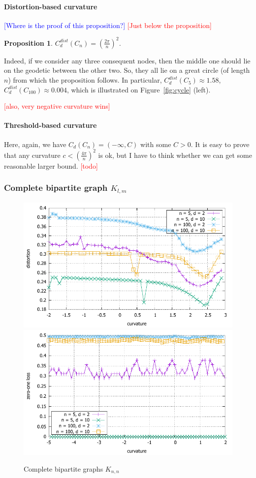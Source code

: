 \documentclass{article} %
\newtheorem{proposition}[theorem]{Proposition}
\newcommand{\ph}[1]{\textcolor{blue}{#1}}
\newcommand{\lt}[1]{\textcolor{red}{#1}}
\begin{document}
\paragraph{Distortion-based curvature} 

\ph{[Where is the proof of this proposition?]} \lt{[Just below the proposition]}

\begin{proposition}\label{prop:cycle_distortion}
$C_d^{dist}(C_n) = \left(\frac{2\pi}{n}\right)^2$.
\end{proposition}

Indeed, if we consider any three consequent nodes, then the middle one should lie on the geodetic between the other two. So, they all lie on a great circle (of length $n$) from which the proposition follows.
In particular, $C_d^{dist}(C_5) \approx 1.58$, $C_d^{dist}(C_{100}) \approx 0.004$, which is illustrated on Figure~\ref{fig:cycle} (left).

\textcolor{red}{[also, very negative curvature wins]}

\paragraph{Threshold-based curvature} 
Here, again, we have $C_d(C_n) = (-\infty, C)$ with some $C>0$. It is easy to prove that any curvature $c < \left(\frac{4\pi}{n}\right)^2$ is ok, but I have to think whether we can get some reasonable larger bound. \textcolor{red}{[todo]}


\subsubsection{Complete bipartite graph $K_{l,m}$}

\begin{figure}
    \centering
    \includegraphics[width = 0.49 \textwidth]{bipartite_distortion.pdf}
    \includegraphics[width = 0.49 \textwidth]{bipartite_zero_one.pdf}
    \caption{Complete bipartite graphs $K_{n,n}$}
    \label{fig:bipartite}
\end{figure}
\end{document}
